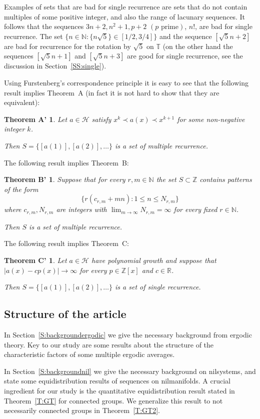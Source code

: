 \documentclass[11pt]{amsart}
\renewcommand{\H}{\mathcal{H}}
\newcommand{\T}{\mathbb{T}}
\newcommand{\R}{\mathbb{R}}
\newcommand{\N}{\mathbb{N}}
\newcommand{\Z}{\mathbb{Z}}
\theoremstyle{plain}
\newtheorem*{theoremA'}{Theorem A'}
\newtheorem*{theoremB'}{Theorem B'}
\newtheorem*{theoremC'}{Theorem C'}
\theoremstyle{definition}
\theoremstyle{remark}
\begin{document}
Examples of sets that are bad for single recurrence are sets that do
not contain multiples of some positive integer, and also the range of
lacunary sequences. It follows that the sequences $3n+2, n^2+1, p+2$
$(p \text{ prime})$, $n!$, are bad for single recurrence. The set
$\big\{n\in\N\colon \{n\sqrt{5}\}\in [1/2,3/4]\big\}$ and the sequence
$[\sqrt{5}n+2]$ are bad for recurrence for the rotation by $\sqrt{5}$
on $\T$ (on the other hand the sequences $[\sqrt{5}n+1]$ and $[\sqrt{5}n+3]$
are good for single
recurrence, see the discussion in Section~\ref{SS:single}).


Using Furstenberg's correspondence principle it is easy to see that
the following result implies Theorem~A (in fact it is not hard to show
that they are equivalent):
\begin{theoremA'}
  Let $a\in\H$  satisfy $x^k\prec a(x) \prec x^{k+1}$ for some
  non-negative integer $k$.

  Then $S=\{[a(1)],[a(2)],\ldots\}$ is a set of multiple recurrence.
\end{theoremA'}

The following result implies Theorem~B:
\begin{theoremB'}
Suppose that for every $r,m\in \N$ the set $S\subset \Z$
  contains patterns of the form $$\{r(c_{r,m}+mn)\colon 1\leq
  n\leq N_{r,m}\}$$ where $c_{r,m}, N_{r,m}$ are integers with $\lim_{m\to\infty}N_{r,m}=\infty$
  for every fixed $r\in \N$.



   Then $S$ is a set of multiple recurrence.
\end{theoremB'}
The following result implies Theorem~C:
\begin{theoremC'}
 Let $a\in\H$ have  polynomial growth and suppose that  $|a(x)-cp(x)|\to \infty $ for every $p\in
  \Z[x]$ and
  $c\in \R$.

  Then $S=\{[a(1)],[a(2)],\ldots\}$ is a set of single recurrence.
\end{theoremC'}

\subsection{Structure of the article}
In Section~\ref{S:backgroundergodic} we give the necessary background from ergodic
theory. Key to our study are some results about the structure of the
characteristic factors of some multiple ergodic averages.


In Section~\ref{S:backgroundnil} we give the necessary background on
nilsystems, and state some equidistribution results of sequences on
nilmanifolds. A crucial ingredient for our study is the quantitative equidistribution
result stated in Theorem~\ref{T:GT} for connected groups.  We
generalize this result to not necessarily connected groups in
Theorem~\ref{T:GT2}.
\end{document}
